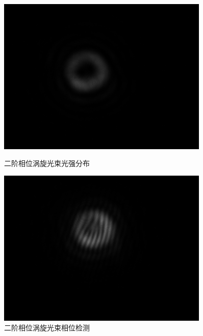 \documentclass[a4paper,UTF8]{ctexart}
\begin{document}
\begin{figure}[H]
    \centering
    \begin{minipage}[b]{0.45\textwidth}
        \centering
        \includegraphics[width=0.9\textwidth]{./fig/4.png}
        \caption{二阶相位涡旋光束光强分布}
    \end{minipage}
    \begin{minipage}[b]{0.45\textwidth}
        \centering
        \includegraphics[width=0.9\textwidth]{./fig/4_1.png}
        \caption{二阶相位涡旋光束相位检测}
    \end{minipage}
\end{figure}
\end{document}
